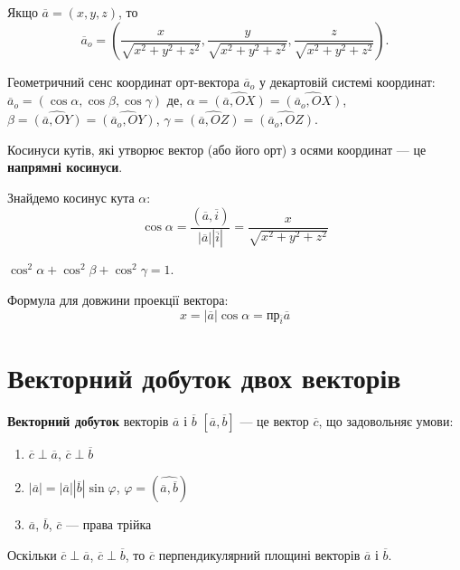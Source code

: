 Якщо $\overline{a} = (x, y, z)$, то
$$\overline{a}_o = \left(\dfrac{x}{\sqrt{x^2+y^2+z^2}}, \dfrac{y}{\sqrt{x^2+y^2+z^2}}, \dfrac{z}{\sqrt{x^2+y^2+z^2}} \right).$$

Геометричний сенс координат орт-вектора $\overline{a}_o$ у декартовій системі координат:
$\overline{a}_o = (\cos\alpha, \cos\beta, \cos\gamma)$ де, $\alpha = \widehat{(\overline{a}, OX)} = \widehat{(\overline{a}_o, OX)}$, $\beta = \widehat{(\overline{a}, OY)} = \widehat{(\overline{a}_o, OY)}$, $\gamma = \widehat{(\overline{a}, OZ)} = \widehat{(\overline{a}_o, OZ)}$.

\begin{definition}
	Косинуси кутів, які утворює вектор (або його орт) з осями координат --- це \textbf{напрямні косинуси}.
\end{definition}

Знайдемо косинус кута $\alpha$: 
$$\cos\alpha = \dfrac{(\overline{a}, \overline{i})}{|\overline{a}||\overline{i}|} = \dfrac{x}{\sqrt{x^2+y^2+z^2}}$$

\begin{claim}
	$\cos^2\alpha + \cos^2\beta + \cos^2\gamma = 1$.
\end{claim}

Формула для довжини проекції вектора:
$$x = |\overline{a}|\cos\alpha = \text{пр}_{\overline{i}}\overline{a}$$

\section{Векторний добуток двох векторів}

\begin{definition}
	\textbf{Векторний добуток} векторів $\overline{a}$ і $\overline{b}$ $[\overline{a}, \overline{b}]$
	--- це вектор $\overline{c}$, що задовольняє умови:
	\begin{enumerate}
		\item $\overline{c}\perp\overline{a}$, $\overline{c}\perp\overline{b}$
		\item $|\overline{a}| = |\overline{a}||\overline{b}|\sin\varphi$, $\varphi = (\widehat{\overline{a},
			\overline{b}})$
		\item $\overline{a}$, $\overline{b}$, $\overline{c}$ --- права трійка
	\end{enumerate}
\end{definition}

\begin{remark}
	Оскільки $\overline{c}\perp\overline{a}$, $\overline{c}\perp\overline{b}$, то $\overline{c}$
	перпендикулярний площині векторів $\overline{a}$ і $\overline{b}$. 
\end{remark}


